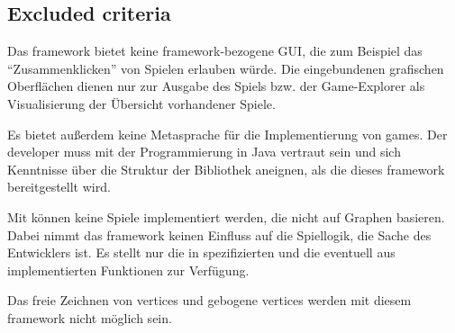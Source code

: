 \subsection{Excluded criteria}
Das {\graphioli} framework bietet keine framework-bezogene GUI, die zum Beispiel das ``Zusammenklicken'' von Spielen erlauben würde. Die eingebundenen grafischen Oberflächen dienen nur zur Ausgabe des Spiels bzw. der Game-Explorer als Visualisierung der Übersicht vorhandener Spiele.\par
Es bietet außerdem keine Metasprache für die Implementierung von games. Der developer muss mit der Programmierung in Java vertraut sein und sich Kenntnisse über die Struktur der Bibliothek aneignen, als die dieses framework bereitgestellt wird.\par
Mit {\graphioli} können keine Spiele implementiert werden, die nicht auf Graphen basieren. Dabei nimmt das framework keinen Einfluss auf die Spiellogik, die Sache des Entwicklers ist. Es stellt nur die in  spezifizierten und die eventuell aus  implementierten Funktionen zur Verfügung.\par
Das freie Zeichnen von vertices und gebogene vertices werden mit diesem framework nicht möglich sein.\par
{}